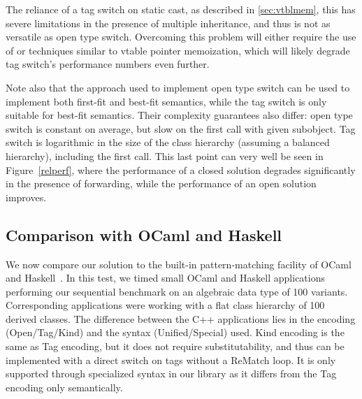 The reliance of a tag switch on static cast, as described in \textsection\ref{sec:vtblmem}, this has severe limitations in the 
presence of multiple inheritance, and thus is not as versatile as open type 
switch. Overcoming this problem will either require the use of 
 or techniques similar to vtable pointer memoization, which 
will likely degrade tag switch's performance numbers even further.

Note also that the approach used to implement open type switch can be used to 
implement both first-fit and best-fit semantics, while the tag switch is only suitable 
for best-fit semantics. Their complexity guarantees also differ: open type 
switch is constant on average, but slow on the first call with given subobject. 
Tag switch is logarithmic in the size of the class hierarchy 
(assuming a balanced hierarchy), including the first call. This last point can 
very well be seen in Figure~\ref{relperf}, where the performance of a closed solution
degrades significantly in the presence of forwarding, while the performance of an
open solution improves.

\subsection{Comparison with OCaml and Haskell}
\label{sec:ocaml}

We now compare our solution to the built-in pattern-matching facility of 
OCaml~\cite{OPM01} and Haskell~\cite{Haskell98Book}.  
In this test, we timed small OCaml and Haskell applications performing our sequential 
benchmark on an algebraic data type of 100 variants. Corresponding \Cpp{} 
applications were working with a flat class hierarchy of 100 derived classes. 
The difference between the C++ applications lies in the encoding (Open/Tag/Kind) 
and the syntax (Unified/Special) used. Kind 
encoding is the same as Tag encoding, but it does not require substitutability, 
and thus can be implemented with a direct switch on tags without a ReMatch loop. 
It is only supported through specialized syntax in our library as it differs 
from the Tag encoding only semantically.


